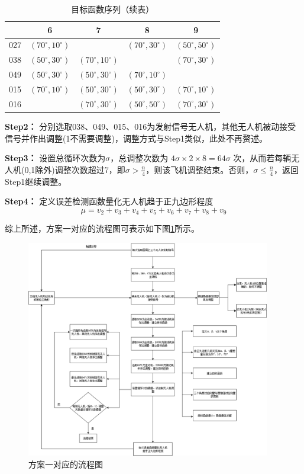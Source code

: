 \documentclass[withoutpreface,bwprint]{cumcmthesis} %
\begin{document}
\begin{table}[htbp]
  \centering
  \caption{目标函数序列（续表）}
  \label{表4}
  \begin{tabular}{ccccc}
    \toprule
    & 6 & 7 & 8 & 9 \\
    \midrule
    027 & $(70^\circ, 10^\circ)$ &  & $(70^\circ, 30^\circ)$ & $(50^\circ, 50^\circ)$ \\
    038 & $(50^\circ, 30^\circ)$ & $(70^\circ, 10^\circ)$ &  & $(70^\circ, 30^\circ)$ \\
    049 & $(50^\circ, 30^\circ)$ & $(50^\circ, 30^\circ)$ & $(70^\circ, 10^\circ)$ &  \\
    015 & $(70^\circ, 10^\circ)$ & $(50^\circ, 30^\circ)$ & $(50^\circ, 30^\circ)$ & $(70^\circ, 10^\circ)$ \\
    016 &  & $(70^\circ, 30^\circ)$ & $(50^\circ, 50^\circ)$ & $(70^\circ, 30^\circ)$ \\
    \bottomrule
  \end{tabular}
\end{table}

    \textbf{Step2：} 分别选取038、049、015、016为发射信号无人机，其他无人机被动接受信号并作出调整(1不需要调整)，调整方式与Step1类似，此处不再赘述。

    \textbf{Step3：} 设置总循环次数为$\sigma$，总调整次数为 $4\sigma \times 2 \times 8 = 64\sigma$ 次，从而若每辆无人机(0,1除外)调整次数超过7，即$\sigma>\frac{n}{4}$，则该飞机调整结束。否则，$\sigma \leq\frac{n}{4}$，返回Step1继续调整。


    \textbf{Step4：} 定义误差检测函数量化无人机趋于正九边形程度
\begin{equation}
\mu = v_2 + v_3 + v_4 + v_5 + v_6 + v_7 + v_8 + v_9
\end{equation}

综上所述，方案一对应的流程图可表示如下图\ref{q3_2}所示。


\begin{figure}[htbp]
    \centering
    \includegraphics[width=0.95\textwidth]{../../figure/q3_2.png} 
    \caption{方案一对应的流程图}
    \label{q3_2}    
\end{figure}
\end{document}
